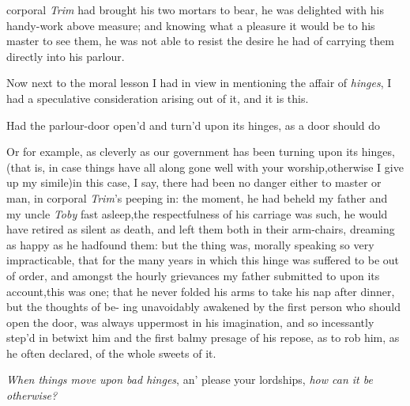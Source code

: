 \documentclass{article}
\begin{document}
 corporal \textit{Trim} had brought
his two mortars to bear, he was delighted with his handy-work
above\break
measure; and knowing what a pleasure it would be to his master to
see them, he was not able to resist the desire he had of carrying
them directly into his parlour.

Now next to the moral lesson I had in view in mentioning the
affair of \textit{hinges}, I had a speculative consideration arising
out of it, and it is this.

Had the parlour-door open’d and\break
turn’d upon its hinges, as a door should do\tsh{}

\tsk Or for example, as cleverly as our government has been
turning upon its hinges,\tsh (that is, in case things have all
along gone well with your worship,\tsk otherwise I give up my
simile)\tsk in this case, I say, there had been no danger either
to master or man, in corporal \textit{Trim}’s peeping in: the
moment, he had beheld my father and my uncle \textit{Toby} fast
asleep,\break\tsk the respectfulness of his carriage was such,
he would have retired as silent as death, and left them both in
their arm-chairs, dreaming as happy as he had\break found them:
but the thing was, morally speaking so very impracticable, that
for the many years in which this hinge was suffered to be out of
order, and amongst the hourly grievances my father submitted to
upon its account,\tsk this was one; that he never folded his
arms to take his nap after dinner, but the thoughts of be-
ing unavoidably awakened by the first person who should open the
door, was always uppermost in his imagination, and so
incessantly step’d in betwixt him and the first balmy presage
of his repose, as to rob him, as he often declared, of the whole
sweets of it.

\indent
\lqq\textit{When things move upon bad hinges}, an’ please your lordships, \textit{how can
it be otherwise?}
\end{document}
